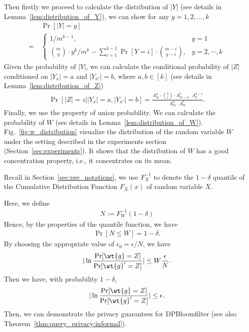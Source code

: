 Then firstly we proceed to calculate the distribution of $|Y|$ (see details in Lemma~\ref{lem:distribution_of_Y}), we can show for any $y = 1,2,\dots,k$
\begin{align*}
    & ~ \Pr[|Y| = y] \\
    = & ~ 
    \begin{cases}
        1 / m^{k-1},  & y = 1 \\
        \binom{m}{y} \cdot y ^k / m^k
        - \sum_{i=1}^{k-1} \Pr[Y = i] \cdot \binom{m - i}{y -i}, & y = 2, \cdots , k
    \end{cases}
\end{align*}
Given the probability of $|Y|$, we can calculate the conditional probability of $|Z|$ conditioned on $|Y_{x}| = a$ and $|Y_{x'}| = b$, where $a,b \in [k]$ (see details in Lemma~\ref{lem:distribution_of_Z})
\begin{align*}
    \Pr[|Z| = z | |Y_x| = a, |Y_{x'}| = b] = \frac{A_m^a \cdot \binom{b}{t} \cdot A_{m - a}^t \cdot A_{a}^{b-t}}{A_m^a \cdot A_m^b}.
\end{align*}
Finally, we use the property of union probability. We can calculate the probability of $W$ (see details in Lemma~\ref{lem:distribution_of_W}). 
Fig.~\ref{fig:w_distribution} visualize the distribution of the random variable $W$ under the setting described in the experiments section (Section~\ref{sec:experiments}). It shows that the distribution of $W$ has a good concentration property, i.e., it concentrates on its mean.

Recall in Section~\ref{sec:pre_notations}, we use $F_{X}^{-1}$ to denote the $1-\delta$ quantile of the Cumulative Distribution Function $F_{X}(x)$ of random variable $X$. 

Here, we define
\begin{align*}
    N:= F_{W}^{-1}(1-\delta)
\end{align*}
Hence, by the properties of the quantile function, we have
\begin{align*}
    \Pr[N \leq W] = 1-\delta.
\end{align*}
By choosing the appropriate value of $\epsilon_0 = \epsilon/N$, we have
\begin{align*}
|\ln{\frac{\Pr[\wt{g} = Z]}{\Pr[\wt{g}' = Z]}}| \leq W\frac{\epsilon}{N}.
\end{align*}
Then we have, with probability $1-\delta$,
\begin{align*}
    |\ln{\frac{\Pr[\wt{g} = Z]}{\Pr[\wt{g}' = Z]}}| \leq \epsilon.
\end{align*}
Then, we can demonstrate the privacy guarantees for DPBloomfilter (see also Theorem~\ref{thm:query_privacy:informal}).



